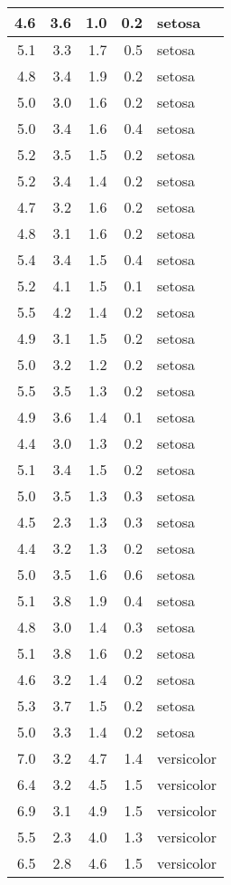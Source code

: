 \documentclass[a4paper, 10pt]{article}\usepackage[]{graphicx}\usepackage[]{color}
\begin{document}
\begin{longtable}{r|r|r|r|l}
\hline
4.6 & 3.6 & 1.0 & 0.2 & setosa\\
\hline
5.1 & 3.3 & 1.7 & 0.5 & setosa\\
\hline
4.8 & 3.4 & 1.9 & 0.2 & setosa\\
\hline
5.0 & 3.0 & 1.6 & 0.2 & setosa\\
\hline
5.0 & 3.4 & 1.6 & 0.4 & setosa\\
\hline
5.2 & 3.5 & 1.5 & 0.2 & setosa\\
\hline
5.2 & 3.4 & 1.4 & 0.2 & setosa\\
\hline
4.7 & 3.2 & 1.6 & 0.2 & setosa\\
\hline
4.8 & 3.1 & 1.6 & 0.2 & setosa\\
\hline
5.4 & 3.4 & 1.5 & 0.4 & setosa\\
\hline
5.2 & 4.1 & 1.5 & 0.1 & setosa\\
\hline
5.5 & 4.2 & 1.4 & 0.2 & setosa\\
\hline
4.9 & 3.1 & 1.5 & 0.2 & setosa\\
\hline
5.0 & 3.2 & 1.2 & 0.2 & setosa\\
\hline
5.5 & 3.5 & 1.3 & 0.2 & setosa\\
\hline
4.9 & 3.6 & 1.4 & 0.1 & setosa\\
\hline
4.4 & 3.0 & 1.3 & 0.2 & setosa\\
\hline
5.1 & 3.4 & 1.5 & 0.2 & setosa\\
\hline
5.0 & 3.5 & 1.3 & 0.3 & setosa\\
\hline
4.5 & 2.3 & 1.3 & 0.3 & setosa\\
\hline
4.4 & 3.2 & 1.3 & 0.2 & setosa\\
\hline
5.0 & 3.5 & 1.6 & 0.6 & setosa\\
\hline
5.1 & 3.8 & 1.9 & 0.4 & setosa\\
\hline
4.8 & 3.0 & 1.4 & 0.3 & setosa\\
\hline
5.1 & 3.8 & 1.6 & 0.2 & setosa\\
\hline
4.6 & 3.2 & 1.4 & 0.2 & setosa\\
\hline
5.3 & 3.7 & 1.5 & 0.2 & setosa\\
\hline
5.0 & 3.3 & 1.4 & 0.2 & setosa\\
\hline
7.0 & 3.2 & 4.7 & 1.4 & versicolor\\
\hline
6.4 & 3.2 & 4.5 & 1.5 & versicolor\\
\hline
6.9 & 3.1 & 4.9 & 1.5 & versicolor\\
\hline
5.5 & 2.3 & 4.0 & 1.3 & versicolor\\
\hline
6.5 & 2.8 & 4.6 & 1.5 & versicolor\\

\end{longtable}
\end{document}
